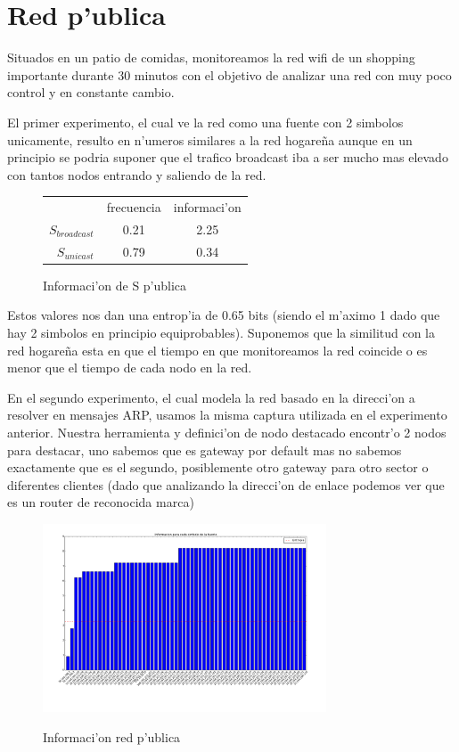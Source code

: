 \section{Red p'ublica}
Situados en un patio de comidas, monitoreamos la red wifi de un shopping importante durante 30 minutos con el objetivo de analizar una red
con muy poco control y en constante cambio.

El primer experimento, el cual ve la red como una fuente con 2 simbolos unicamente, resulto en n'umeros similares a la red hogare\~na 
aunque en un principio se podria suponer que el trafico broadcast iba a ser mucho mas elevado con tantos nodos entrando y saliendo
de la red. 

\begin{figure}[!h]
\centering
\caption{Informaci'on de S p'ublica}
\begin{tabular}{ r|c|c| }
\multicolumn{1}{r}{}
 &  \multicolumn{1}{c}{frecuencia}
 & \multicolumn{1}{c}{informaci'on} \\
\cline{2-3}
$S_{broadcast}$ & 0.21 & 2.25 \\
\cline{2-3}
$S_{unicast}$ & 0.79 & 0.34 \\
\cline{2-3}
\end{tabular}
\end{figure}
 
Estos valores nos dan una entrop'ia de 0.65 bits (siendo el m'aximo 1 dado que hay 2 simbolos en principio equiprobables). Suponemos
que la similitud con la red hogare\~na esta en que el tiempo en que monitoreamos la red coincide o es menor que el tiempo de cada nodo en la
red.
 
En el segundo experimento, el cual modela la red basado en la direcci'on a resolver en mensajes ARP, usamos la misma captura
utilizada en el experimento anterior. Nuestra herramienta y definici'on de nodo destacado encontr'o 2 nodos para destacar, uno sabemos que es
gateway por default mas no sabemos exactamente que es el segundo, posiblemente otro gateway para otro sector o diferentes clientes (dado
que analizando la direcci'on de enlace podemos ver que es un router de reconocida marca)
 
\begin{figure}[!h]
\centering
\caption{Informaci'on red p'ublica}
\includegraphics[width=0.75\textwidth]{red3_info}
 \label{fig:red3info}
\end{figure}

